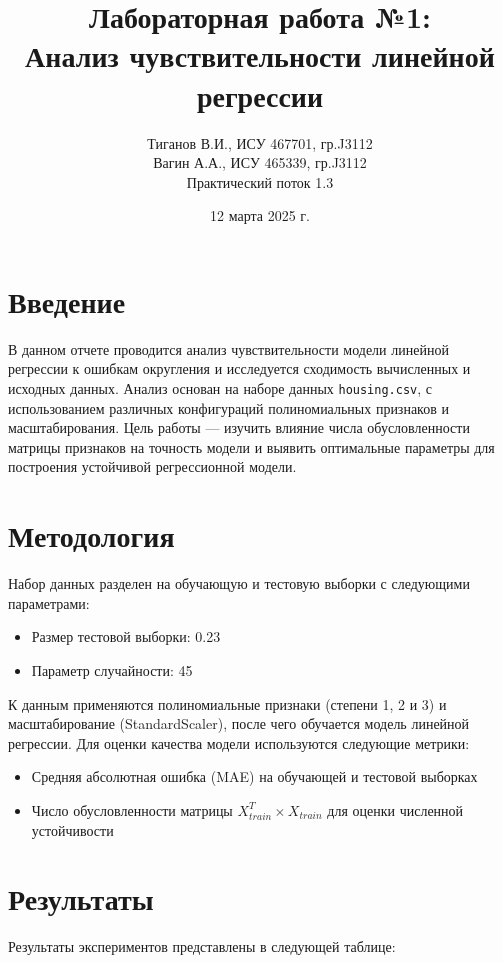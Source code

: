 \documentclass{article}
\title{Лабораторная работа №1:\\
Анализ чувствительности линейной регрессии}
\author{Тиганов В.И., ИСУ 467701, гр.J3112 \\ Вагин А.А., ИСУ 465339, гр.J3112 \\ Практический поток 1.3}
\date{12 марта 2025 г.}
\begin{document}
\maketitle

\section{Введение}
В данном отчете проводится анализ чувствительности модели линейной регрессии к ошибкам округления и исследуется сходимость вычисленных и исходных данных. Анализ основан на наборе данных \texttt{housing.csv}, с использованием различных конфигураций полиномиальных признаков и масштабирования. Цель работы — изучить влияние числа обусловленности матрицы признаков на точность модели и выявить оптимальные параметры для построения устойчивой регрессионной модели.

\section{Методология}
Набор данных разделен на обучающую и тестовую выборки с следующими параметрами:
\begin{itemize}
    \item Размер тестовой выборки: 0.23
    \item Параметр случайности: 45
\end{itemize}

К данным применяются полиномиальные признаки (степени 1, 2 и 3) и масштабирование (StandardScaler), после чего обучается модель линейной регрессии. Для оценки качества модели используются следующие метрики:
\begin{itemize}
    \item Средняя абсолютная ошибка (MAE) на обучающей и тестовой выборках
    \item Число обусловленности матрицы \( X_{train}^T \times X_{train} \) для оценки численной устойчивости
\end{itemize}

\section{Результаты}
Результаты экспериментов представлены в следующей таблице:
\end{document}
